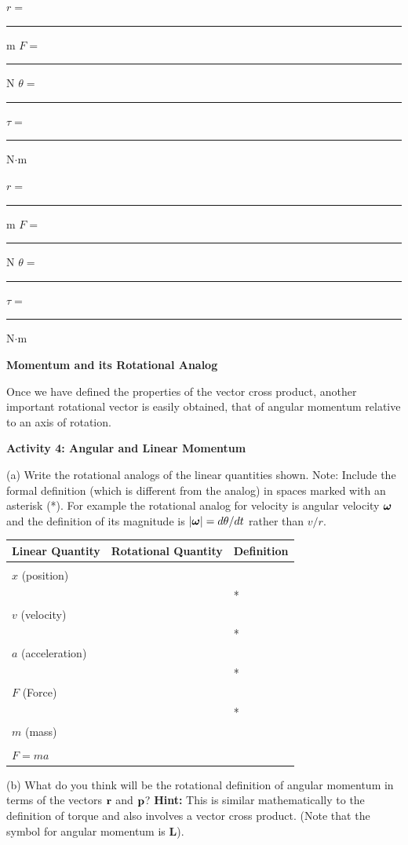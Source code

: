 $r =$ \rule{0.5in}{0.1pt} m \hfill{}$F =$ 
\rule{0.5in}{0.1pt} N \hfill{}\( \theta  =\)
 \rule{0.5in}{0.1pt} \hfill{}\( \tau  =\)  \rule{0.5in}{0.1pt} N\( \cdot  \)m 
\vspace{5mm}

$r = $\rule{0.5in}{0.1pt} m \hfill{}$F =$ \rule{0.5in}{0.1pt} N \hfill{}
\( \theta = \)
\rule{0.5in}{0.1pt} \hfill{}\( \tau  =\)  \rule{0.5in}{0.1pt} N\( \cdot  \)m
\vspace{5mm}

\textbf{Momentum and its Rotational Analog} 

Once we have defined the properties of the vector cross product, another important
rotational vector is easily obtained, that of angular momentum relative to an
axis of rotation. 

\textbf{Activity 4: Angular and Linear Momentum }

(a) Write the rotational analogs of the linear quantities shown. Note: Include
the formal definition (which is different from the analog) in spaces marked
with an asterisk ({*}). For example the rotational analog for velocity is angular velocity \( \mbox{\boldmath$\omega$}  \) and the definition of its magnitude is \( |
\mbox{\boldmath$\omega$}  |
= d \theta  /dt\) rather than $v/r$.

\vspace{0.3cm}
{\centering \begin{tabular}{|p{5cm}|p{5cm}|p{5cm}|}
\hline 
Linear Quantity&
Rotational Quantity&
Definition\\
\hline 
\hline 
&
&
\\
$x$ (position) &
&
\\
\hline 
&
&
{*}\\
$v$ (velocity) &
&
\\
\hline 
&
&
{*}\\
$a$ (acceleration) &
&
\\
\hline 
&
&
{*}\\
$F$ (Force) &
&
\\
\hline 
&
&
{*}\\
$m$ (mass) &
&
\\
\hline 
&
&
\\
$F = ma$&
&
\\
\hline 
\end{tabular}\par}
\vspace{0.3cm}

(b) What do you think will be the rotational definition of angular momentum
in terms of the vectors \( {\bf r} \) and \( {\bf p} \)?
\textbf{Hint:} This is similar mathematically to the definition of torque and
also involves a vector cross product. (Note that the symbol for angular momentum is \textbf{L}).
\answerspace{20mm}

